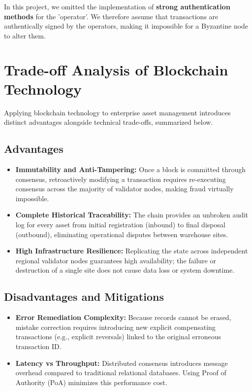 \documentclass[11pt, a4paper, oneside]{memoir}
\begin{document}
In this project, we omitted the implementation of \textbf{strong authentication methods} for the 'operator'. We therefore assume that transactions are authentically signed by the operators, making it impossible for a Byzantine node to alter them. 

\section{Trade-off Analysis of Blockchain Technology}
Applying blockchain technology to enterprise asset management introduces distinct advantages alongside technical trade-offs, summarized below.

\subsection{Advantages}
\begin{itemize}
    \item \textbf{Immutability and Anti-Tampering:} Once a block is committed through consensus, retroactively modifying a transaction requires re-executing consensus across the majority of validator nodes, making fraud virtually impossible.
    \item \textbf{Complete Historical Traceability:} The chain provides an unbroken audit log for every asset from initial registration (inbound) to final disposal (outbound), eliminating operational disputes between warehouse sites.
    \item \textbf{High Infrastructure Resilience:} Replicating the state across independent regional validator nodes guarantees high availability; the failure or destruction of a single site does not cause data loss or system downtime.
\end{itemize}

\subsection{Disadvantages and Mitigations}
\begin{itemize}
    \item \textbf{Error Remediation Complexity:} Because records cannot be erased, mistake correction requires introducing new explicit compensating transactions (e.g., explicit reversals) linked to the original erroneous transaction ID.
    \item \textbf{Latency vs Throughput:} Distributed consensus introduces message overhead compared to traditional relational databases. Using Proof of Authority (PoA) minimizes this performance cost.
\end{itemize}
\end{document}
